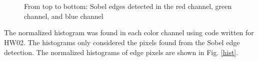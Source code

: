 \documentclass{article}[12 pt]
\begin{document}
\begin{figure}[H]
\captionsetup[subfloat]{labelformat=empty}
\centering
{} \\
 \\
\caption{From top to bottom: Sobel edges detected in the red channel, green channel, and blue channel}
\label{edges}
\end{figure}

\noindent
The normalized histogram was found in each color channel using code written for HW02.  The histograms only considered the pixels found from the Sobel edge detection.  The normalized histograms of edge pixels are shown in Fig. \ref{hist}.
\end{document}
